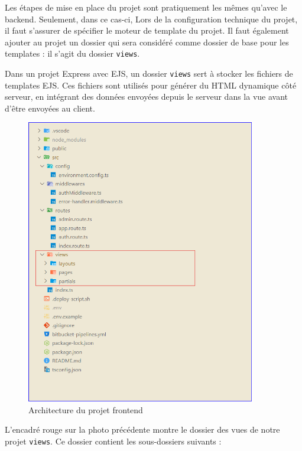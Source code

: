 {\vspace{0.35cm}

Les étapes de mise en place du projet sont pratiquement les mêmes qu'avec le backend. Seulement, dans ce cas-ci, Lors de la configuration technique du projet, il faut s'assurer de spécifier le moteur de template du projet. Il faut également ajouter au projet un dossier qui sera considéré comme dossier de base pour les templates : il s'agit du dossier \verb|views|. 

\vspace{0.35cm} 
Dans un projet Express avec EJS, un dossier \verb|views| sert à stocker les fichiers de templates EJS. Ces fichiers sont utilisés pour générer du HTML dynamique côté serveur, en intégrant des données envoyées depuis le serveur dans la vue avant d'être envoyées au client.

\vspace{0.35cm}

\begin{figure}[H]
\begin{center}
\includegraphics[width=10cm]{assets/presentation/fixaars-front.png}
\end{center}
\caption{Architecture du projet frontend}
\end{figure}

L'encadré rouge sur la photo précédente montre le dossier des vues de notre projet \verb|views|. Ce dossier contient les sous-dossiers suivants : 

}
